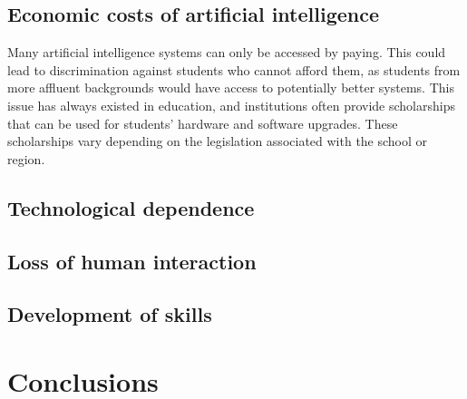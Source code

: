 \documentclass[a4paper,12pt]{article}
\begin{document}
\subsection{Economic costs of artificial intelligence}
Many artificial intelligence systems can only be accessed by paying. This could lead to discrimination against students who cannot afford them, as students from more affluent backgrounds would have access to potentially better systems. This issue has always existed in education, and institutions often provide scholarships that can be used for students' hardware and software upgrades. These scholarships vary depending on the legislation associated with the school or region.

\subsection{Technological dependence}
\subsection{Loss of human interaction}
\subsection{Development of skills}

\section{Conclusions}



\newpage    %

\end{document}

